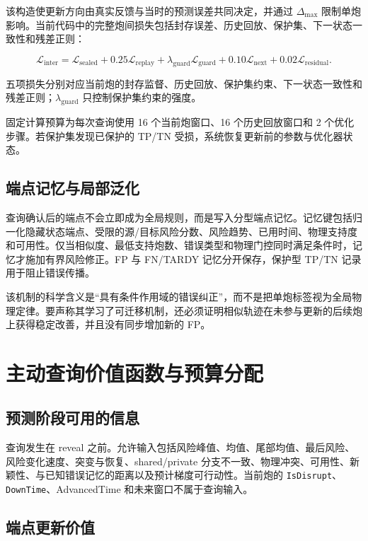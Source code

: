 \documentclass[11pt,a4paper]{article}
\newcommand{\code}[1]{\texttt{\small #1}}
\begin{document}
该构造使更新方向由真实反馈与当时的预测误差共同决定，并通过 \(\Delta_{\max}\) 限制单炮影响。当前代码中的完整炮间损失包括封存误差、历史回放、保护集、下一状态一致性和残差正则：

\begin{equation}
\mathcal{L}_{\mathrm{inter}}
=\mathcal{L}_{\mathrm{sealed}}
 +0.25\mathcal{L}_{\mathrm{replay}}
 +\lambda_{\mathrm{guard}}\mathcal{L}_{\mathrm{guard}}
 +0.10\mathcal{L}_{\mathrm{next}}
 +0.02\mathcal{L}_{\mathrm{residual}}.
\label{eq:inter-loss}
\end{equation}

五项损失分别对应当前炮的封存监督、历史回放、保护集约束、下一状态一致性和残差正则；\(\lambda_{\mathrm{guard}}\) 只控制保护集约束的强度。

固定计算预算为每次查询使用 16 个当前炮窗口、16 个历史回放窗口和 2 个优化步骤。若保护集发现已保护的 TP/TN 受损，系统恢复更新前的参数与优化器状态。

\subsection{端点记忆与局部泛化}

查询确认后的端点不会立即成为全局规则，而是写入分型端点记忆。记忆键包括归一化隐藏状态端点、受限的源/目标风险分数、风险趋势、已用时间、物理支持度和可用性。仅当相似度、最低支持炮数、错误类型和物理门控同时满足条件时，记忆才施加有界风险修正。FP 与 FN/TARDY 记忆分开保存，保护型 TP/TN 记录用于阻止错误传播。

该机制的科学含义是“具有条件作用域的错误纠正”，而不是把单炮标签视为全局物理定律。要声称其学习了可迁移机制，还必须证明相似轨迹在未参与更新的后续炮上获得稳定改善，并且没有同步增加新的 FP。

\section{主动查询价值函数与预算分配}

\subsection{预测阶段可用的信息}

查询发生在 reveal 之前。允许输入包括风险峰值、均值、尾部均值、最后风险、风险变化速度、突变与恢复、shared/private 分支不一致、物理冲突、可用性、新颖性、与已知错误记忆的距离以及预计梯度可行动性。当前炮的 \code{IsDisrupt}、\code{DownTime}、AdvancedTime 和未来窗口不属于查询输入。

\subsection{端点更新价值}
\end{document}
